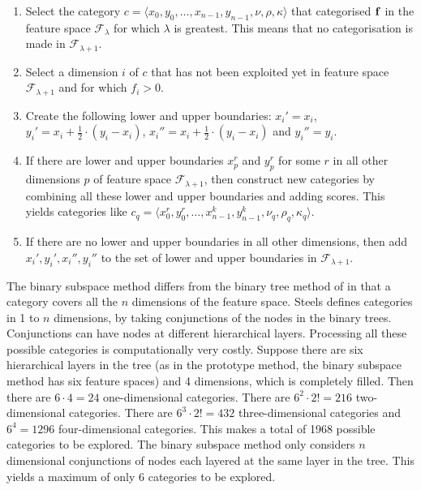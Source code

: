 \begin{enumerate}
\item Select the category $c=\langle x_0,y_0,\ldots,x_{n-1},y_{n-1},\nu,\rho,\kappa \rangle$ that categorised ${\bf f}$ in the feature space ${\mathcal F}_\lambda$ for which $\lambda$ is greatest. This means that no categorisation is made in ${\mathcal F}_{\lambda+1}$.

\item Select a dimension $i$ of $c$ that has not been exploited yet in feature space ${\mathcal F}_{\lambda+1}$ and for which $f_i>0$.

\item Create the following lower and upper boundaries: $x_i'=x_i$, $y_i'=x_i+\frac{1}{2} \cdot (y_i-x_i)$, $x_i''=x_i+\frac{1}{2} \cdot (y_i-x_i)$ and $y_i''=y_i$.

\item If there are lower and upper boundaries $x_p^r$ and $y_p^r$ for some $r$ in all other dimensions $p$ of feature space ${\mathcal F}_{\lambda+1}$, then construct new categories by combining all these lower and upper boundaries and adding scores. This yields categories like $c_q = \langle x_0^r,y_0^r,\ldots,x_{n-1}^k,y_{n-1}^k,\nu_q,\rho_q,\kappa_q \rangle$.

\item If there are no lower and upper boundaries in all other dimensions, then add $x_i',y_i',x_i'',y_i''$ to the set of lower and upper boundaries in ${\mathcal F}_{\lambda+1}$.

\end{enumerate}

The binary subspace method differs from the binary tree method of \citet{steels:1996b} in that a category covers all the $n$ dimensions of the feature space. Steels defines categories in 1 to $n$ dimensions, by taking conjunctions of the nodes in the binary trees. Conjunctions can have nodes at different hierarchical layers. Processing all these possible categories is computationally very costly. Suppose there are six hierarchical layers in the tree (as in the prototype method, the binary subspace method has six feature spaces) and 4 dimensions, which is completely filled. Then there are $6\cdot 4=24$ one-dimensional categories. There are $6^2\cdot 2!=216$ two-dimensional categories. There are $6^3\cdot 2!=432$ three-dimensional categories and $6^4=1296$ four-dimensional categories. This makes a total of 1968 possible categories to be explored. The binary subspace method only considers $n$ dimensional conjunctions of nodes each layered at the same layer in the tree. This yields a maximum of only 6 categories to be explored.

